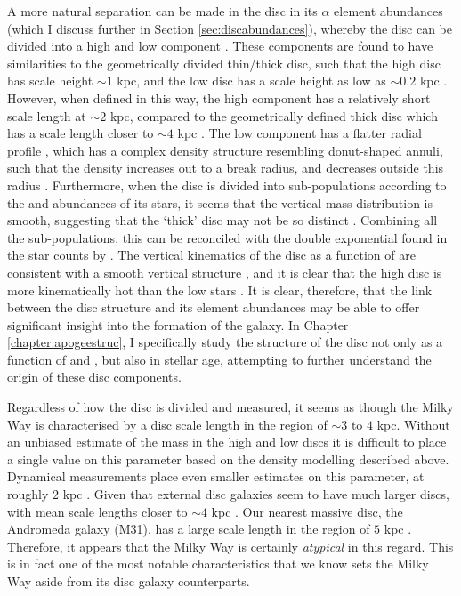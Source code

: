 A more natural separation can be made in the disc in its $\alpha$ element abundances (which I discuss further in Section \ref{sec:discabundances}), whereby the disc can be divided into a high and low \afe{} component \citep[e.g.][]{1998A&A...338..161F,2003A&A...410..527B,2005A&A...433..185B,2013A&A...560A.109H,2014A&A...562A..71B,2014A&A...564A.115A,2014ApJ...796...38N,2015ApJ...808..132H}. These components are found to have similarities to the geometrically divided thin/thick disc, such that the high \afe{} disc has scale height $\sim 1$ kpc, and the low \afe{} disc has a scale height as low as $\sim 0.2$ kpc \citep[e.g.][]{2012ApJ...753..148B,2016ApJ...823...30B}. However, when defined in this way, the high \afe{} component has a relatively short scale length at $\sim 2$ kpc, compared to the geometrically defined thick disc which has a scale length closer to $\sim4$ kpc \citep{2008ApJ...673..864J}. The low \afe{} component has a flatter radial profile \citep{2012ApJ...752...51C}, which has a complex density structure resembling donut-shaped annuli, such that the density increases out to a break radius, and decreases outside this radius \citep{2012ApJ...753..148B,2016ApJ...823...30B}. Furthermore, when the disc is divided into sub-populations according to the \afe{} and \feh{} abundances of its stars, it seems that the vertical mass distribution is smooth, suggesting that the `thick' disc may not be so distinct \citep{2012ApJ...751..131B}. Combining all the sub-populations, this can be reconciled with the double exponential found in the star counts by \citet{1983MNRAS.202.1025G} \citep[see][]{2013A&ARv..21...61R}. The vertical kinematics of the disc as a function of \afe{} are consistent with a smooth vertical structure \citep{2012ApJ...755..115B}, and it is clear that the high \afe{} disc is more kinematically hot than the low \afe{} stars \citep[e.g.][]{2005A&A...433..185B}. It is clear, therefore, that the link between the disc structure and its element abundances may be able to offer significant insight into the formation of the galaxy. In Chapter \ref{chapter:apogeestruc}, I specifically study the structure of the disc not only as a function of \afe{} and \feh{}, but also in stellar age, attempting to further understand the origin of these disc components.

Regardless of how the disc is divided and measured, it seems as though the Milky Way is characterised by a disc scale length in the region of $\sim 3$ to $4$ kpc. Without an unbiased estimate of the mass in the high and low \afe{} discs it is difficult to place a single value on this parameter based on the density modelling described above. Dynamical measurements place even smaller estimates on this parameter, at roughly $2$ kpc \citep{2013ApJ...779..115B}. Given that external disc galaxies seem to have much larger discs, with mean scale lengths closer to $\sim 4$ kpc \citep[e.g.][]{2010MNRAS.406.1595F}. Our nearest massive disc, the Andromeda galaxy (M31), has a large scale length in the region of $5$ kpc \citep[e.g.][]{2011ApJ...739...20C}. Therefore, it appears that the Milky Way is certainly \emph{atypical} in this regard. This is in fact one of the most notable characteristics that we know sets the Milky Way aside from its disc galaxy counterparts.

